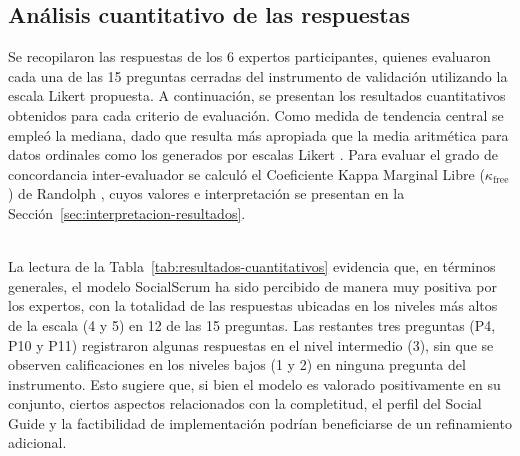 \subsection{Análisis cuantitativo de las respuestas}
Se recopilaron las respuestas de los 6 expertos participantes, quienes evaluaron cada una de las 15 preguntas cerradas del instrumento de validación utilizando la escala Likert propuesta. A continuación, se presentan los resultados cuantitativos obtenidos para cada criterio de evaluación. Como medida de tendencia central se empleó la mediana, dado que resulta más apropiada que la media aritmética para datos ordinales como los generados por escalas Likert \cite{jamieson2004}. Para evaluar el grado de concordancia inter-evaluador se calculó el Coeficiente Kappa Marginal Libre ($\kappa_{\text{free}}$) de Randolph \cite{randolph2005}, cuyos valores e interpretación se presentan en la Sección~\ref{sec:interpretacion-resultados}.

\mbox{}\\[-0.1\baselineskip]
La lectura de la Tabla~\ref{tab:resultados-cuantitativos} evidencia que, en términos generales, el modelo SocialScrum ha sido percibido de manera muy positiva por los expertos, con la totalidad de las respuestas ubicadas en los niveles más altos de la escala (4 y 5) en 12 de las 15 preguntas. Las restantes tres preguntas (P4, P10 y P11) registraron algunas respuestas en el nivel intermedio (3), sin que se observen calificaciones en los niveles bajos (1 y 2) en ninguna pregunta del instrumento. Esto sugiere que, si bien el modelo es valorado positivamente en su conjunto, ciertos aspectos relacionados con la completitud, el perfil del Social Guide y la factibilidad de implementación podrían beneficiarse de un refinamiento adicional.

\begingroup
\scriptsize
\renewcommand{\arraystretch}{1.4}
\setlength{\tabcolsep}{4pt}
\setlength{\LTleft}{0pt}
\setlength{\LTright}{0pt}

